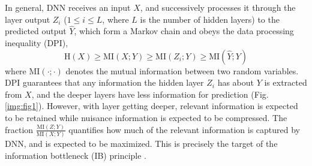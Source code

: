 \documentclass[10pt,journal,compsoc]{IEEEtran}
\begin{document}
In general, DNN receives an input $X$, and successively processes it through the layer output $Z_{i}$ ($1 \leq i \leq L$, where $L$ is the number of hidden layers) to the predicted output $\hat{Y}$, which form a Markov chain and obeys the data processing inequality (DPI),
\begin{equation}
\label{eq:DPI}
\mathrm{H}(X) \geq \mathrm{MI}(X; Y) \geq \mathrm{MI}(Z_i; Y) \geq \mathrm{MI}(\hat{Y};Y)
\end{equation}
where $\mathrm{MI(\cdot; \cdot)}$ denotes the mutual information between two random variables. DPI guarantees that any information the hidden layer $Z_i$ has about $Y$ is extracted from $X$, and the deeper layers have less information for prediction (Fig. \ref{img:fig1}). However, with layer getting deeper, relevant information is expected to be retained while nuisance information is expected to be compressed. The fraction $\frac{\mathrm{MI}(Z; Y)}{\mathrm{MI}(X; Y)}$ quantifies how much of the relevant information is captured by DNN, and is expected to be maximized. This is precisely the target of the information bottleneck (IB) principle \cite{Tishby2015DeepLA}.
\end{document}
